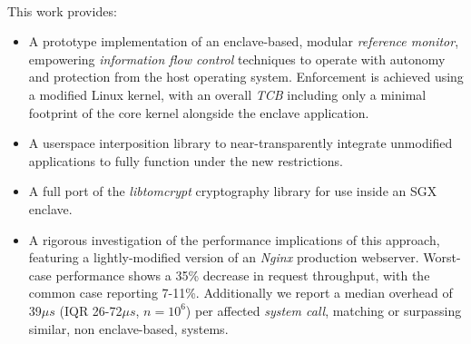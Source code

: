 \paragraph{} This work provides:
\begin{itemize}
    \item A prototype implementation of an enclave-based, modular \textit{reference monitor}, empowering \textit{information flow control} techniques to operate with autonomy and protection from the host operating system. Enforcement is achieved using a modified Linux kernel, with an overall \textit{TCB} including only a minimal footprint of the core kernel alongside the enclave application.
    \item A userspace interposition library to near-transparently integrate unmodified applications to fully function under the new restrictions.
    \item A full port of the \textit{libtomcrypt} cryptography library for use inside an SGX enclave.
    \item A rigorous investigation of the performance implications of this approach, featuring a lightly-modified version of an \textit{Nginx} production webserver. Worst-case performance shows a 35\% decrease in request throughput, with the common case reporting 7-11\%. Additionally we report a median overhead of 39$\mu s$ (IQR 26-72$\mu s$, $n = 10^6$) per affected \textit{system call}, matching or surpassing similar, non enclave-based, systems.
\end{itemize}